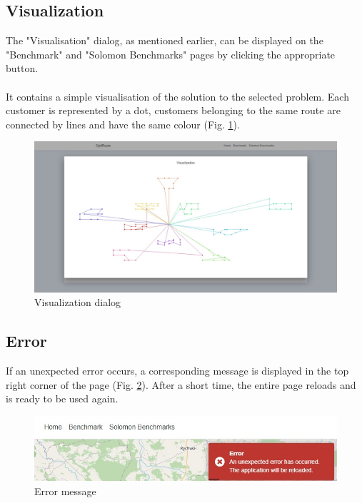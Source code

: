 \documentclass[a4paper,twoside,12pt]{book}
\begin{document}
\subsection{Visualization}

The "Visualisation" dialog, as mentioned earlier, can be displayed on the "Benchmark" and "Solomon Benchmarks" pages by clicking the appropriate button. 
\paragraph{}
It contains a simple visualisation of the solution to the selected problem. Each customer is represented by a dot, customers belonging to the same route are connected by lines and have the same colour (Fig. \ref{fig:visualization}).

\begin{figure}[H]
\centering
\includegraphics[scale=0.3]{images/visualization.jpg}
\caption{Visualization dialog}
\label{fig:visualization}
\end{figure}

\subsection{Error}

If an unexpected error occurs, a corresponding message is displayed in the top right corner of the page (Fig. \ref{fig:error}). After a short time, the entire page reloads and is ready to be used again.

\begin{figure}[H]
\centering
\includegraphics[scale=0.7]{images/error.jpg}
\caption{Error message}
\label{fig:error}
\end{figure}
\end{document}

